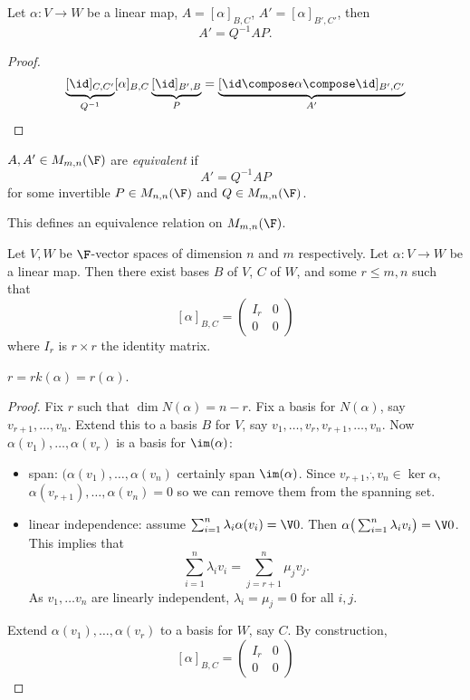 \documentclass[a4paper]{article}
\theoremstyle{definition}
\begin{document}
\begin{prop}
  Let \(\alpha: V\to W\) be a linear map, \(A = [\alpha]_{B,C}\), \(A' = [\alpha]_{B',C'}\), then
  \[
    A' = Q^{-1}AP.
  \]
\end{prop}

\begin{proof}
  \[
    \underbrace{[\id]_{C,C'}}_{Q^{-1}} [\alpha]_{B,C} \underbrace{[\id]_{B',B}}_P = \underbrace{[\id\compose\alpha\compose\id]_{B',C'}}_{A'}
  \]
\end{proof}

\begin{defi}
  \(A, A' \in M_{m,n}(\F)\) are \emph{equivalent} if
  \[
    A' = Q^{-1}AP
  \]
  for some invertible \(P\in M_{n,n}(\F)\) and \(Q\in M_{m,n}(\F)\).
\end{defi}

\begin{note}
  This defines an equivalence relation on \(M_{m,n}(\F)\).
\end{note}

\begin{prop}
  Let \(V, W\) be \(\F\)-vector spaces of dimension \(n\) and \(m\) respectively. Let \(\alpha:V\to W\) be a linear map. Then there exist bases \(B\) of \(V\), \(C\) of \(W\), and some \(r\leq m,n\) such that
  \[
    [\alpha]_{B,C} =
    \begin{pmatrix}
      I_r & 0 \\
      0 & 0 
    \end{pmatrix}
  \]
  where \(I_r\) is \(r\times r\) the identity matrix.
\end{prop}

\begin{note}
  \(r = rk(\alpha) = r(\alpha)\).
\end{note}

\begin{proof}
  Fix \(r\) such that \(\dim N(\alpha) = n-r\). Fix a basis for \(N(\alpha)\), say \(v_{r+1},\dots,v_n\). Extend this to a basis \(B\) for \(V\), say \(v_1,\dots,v_r,v_{r+1},\dots,v_n\). Now \(\alpha(v_1),\dots,\alpha(v_r)\) is a basis for \(\im(\alpha)\):
  \begin{itemize}
  \item span: \((\alpha(v_1),\dots, \alpha(v_n)\) certainly span \(\im(\alpha)\). Since \(v_{r+1},\dot,v_n \in \ker \alpha\), \(\alpha(v_{r+1}),\dots,\alpha(v_n) = 0\) so we can remove them from the spanning set.
  \item linear independence: assume \(\sum_{i=1}^{n}\lambda_i \alpha(v_i) =\V 0 \). Then \(\alpha \big(\sum_{i=1}^n\lambda_iv_i\big) =\V0\). This implies that
    \[
      \sum_{i=1}^{n}\lambda_iv_i = \sum_{j=r+1}^{n}\mu_jv_j.
    \]
    As \(v_1,\dots v_n\) are linearly independent, \(\lambda_i=\mu_j=0\) for all \(i,j\).
  \end{itemize}
  Extend \(\alpha(v_1),\dots,\alpha(v_r)\) to a basis for \(W\), say \(C\). By construction,
  \[
    [\alpha]_{B,C} =
    \begin{pmatrix}
      I_r & 0 \\
      0 & 0
    \end{pmatrix}
  \]
\end{proof}
\end{document}
